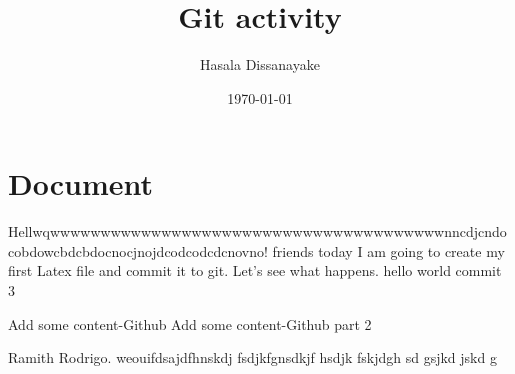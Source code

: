 \documentclass[a4 paper]{article}
\title{Git activity}
\author{Hasala Dissanayake}
\date{\today}
\begin{document}
\maketitle
\section{Document}

Hellwqwwwwwwwwwwwwwwwwwwwwwwwwwwwwwwwwwwwwwwwnncdjcndocobdowcbdcbdocnocjnojdcodcodcdcnovno! friends today I am going to create my first Latex file and commit it to git. Let's see what happens.
hello world
commit 3

Add some content-Github
Add some content-Github part 2

\newpage
Ramith Rodrigo. weouifdsajdfhnskdj fsdjkfgnsdkjf hsdjk fskjdgh sd gsjkd jskd g
\end{document}
